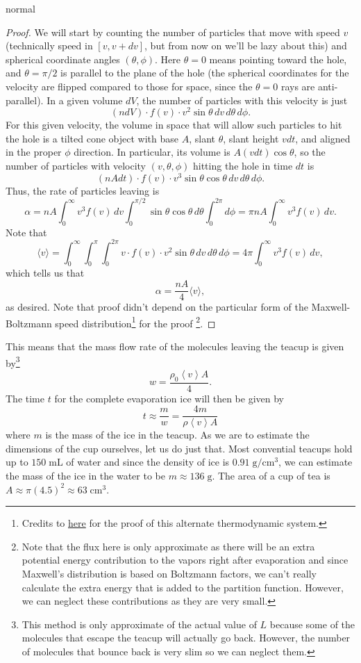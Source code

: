 \begin{solution}{normal}
\begin{proof}
We will start by counting the number of particles that move with speed $v$ (technically speed in $[v,v+dv]$, but from now on we'll be lazy about this) and spherical coordinate angles $(\theta,\phi)$. Here $\theta=0$ means pointing toward the hole, and $\theta=\pi/2$ is parallel to the plane of the hole (the spherical coordinates for the velocity are flipped compared to those for space, since the $\theta=0$ rays are anti-parallel). In a given volume $dV$, the number of particles with this velocity is just
\[(n dV)\cdot f(v)\cdot v^2\sin\theta \,dv \,d\theta\, d\phi.\]For this given velocity, the volume in space that will allow such particles to hit the hole is a tilted cone object with base $A$, slant $\theta$, slant height $vdt$, and aligned in the proper $\phi$ direction. In particular, its volume is $A(vdt)\cos\theta$, so the number of particles with velocity $(v,\theta,\phi)$ hitting the hole in time $dt$ is
\[(n A dt)\cdot f(v)\cdot v^3\sin\theta\cos\theta \,dv \,d\theta\, d\phi.\]Thus, the rate of particles leaving is
\[\alpha=n A\int_0^\infty v^3f(v)\,dv\int_0^{\pi/2}\sin\theta\cos\theta\,d\theta\int_0^{2\pi}d\phi=\pi n A\int_0^\infty v^3f(v)\,dv.\]Note that
\[\langle v\rangle=\int_0^\infty\int_0^\pi\int_0^{2\pi} v\cdot f(v)\cdot v^2\sin\theta\,dv\,d\theta\,d\phi=4\pi\int_0^\infty v^3f(v)\,dv,\]which tells us that
\[\alpha=\frac{n A}{4}\langle v\rangle,\]as desired. Note that proof didn't depend on the particular form of the Maxwell-Boltzmann speed distribution\footnote{Credits to \hyperlink{https://artofproblemsolving.com/community/c473124h1890945_diffusion_problem}{here} for the proof of this alternate thermodynamic system.} for the proof \footnote{Note that the flux here is only approximate as there will be an extra potential energy contribution to the vapors right after evaporation and since Maxwell's distribution is based on Boltzmann factors, we can't really calculate the extra energy that is added to the partition function. However, we can neglect these contributions as they are very small.}.
\end{proof}
This means that the mass flow rate of the molecules leaving the teacup is given by\footnote{This method is only approximate of the actual value of $L$ because some of the molecules that escape the teacup will actually go back. However, the number of molecules that bounce back is very slim so we can neglect them.} 
\[w = \frac{\rho_0 \left<v\right> A}{4}.\]
The time $t$ for the complete evaporation ice will then be given by 
\[t \approx \frac{m}{w} = \frac{4m}{\rho \left<v\right> A}\]
where $m$ is the mass of the ice in the teacup. As we are to estimate the dimensions of the cup ourselves, let us do just that. Most convential teacups hold up to $150\;\mathrm{mL}$ of water and since the density of ice is $0.91\;\mathrm{g/cm^3}$, we can estimate the mass of the ice in the water to be $m \approx 136\;\mathrm{g}$. The area of a cup of tea is $A \approx \pi (4.5)^2 \approx 63\;\mathrm{cm^3}$. 
\vspace{3mm}


\end{solution}
